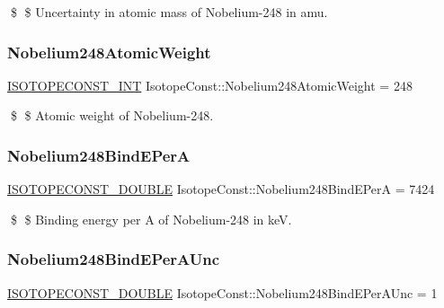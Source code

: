 \$ \$ Uncertainty in atomic mass of Nobelium-\/248 in amu. \mbox{\label{group___isotope_const-_nobelium-_no248_gaf434d32b0a303d3e1e0b02b1b6e5ca65}} 
\subsubsection{\texorpdfstring{Nobelium248\+Atomic\+Weight}{Nobelium248AtomicWeight}}
{\footnotesize\ttfamily \mbox{\hyperlink{group___isotope_const-_macros_ga5f18360b3e99483a35c32d789e62621c}{I\+S\+O\+T\+O\+P\+E\+C\+O\+N\+S\+T\+\_\+\+I\+NT}} Isotope\+Const\+::\+Nobelium248\+Atomic\+Weight = 248}

\$ \$ Atomic weight of Nobelium-\/248. \mbox{\label{group___isotope_const-_nobelium-_no248_ga08e5c7e8f6027ddc520299651cbd061a}} 
\subsubsection{\texorpdfstring{Nobelium248\+Bind\+E\+PerA}{Nobelium248BindEPerA}}
{\footnotesize\ttfamily \mbox{\hyperlink{group___isotope_const-_macros_ga8f45a7272ce02c0b4c65c44636ed719a}{I\+S\+O\+T\+O\+P\+E\+C\+O\+N\+S\+T\+\_\+\+D\+O\+U\+B\+LE}} Isotope\+Const\+::\+Nobelium248\+Bind\+E\+PerA = 7424}

\$ \$ Binding energy per A of Nobelium-\/248 in keV. \mbox{\label{group___isotope_const-_nobelium-_no248_gab64705b25614f24a1da318fc472de96b}} 
\subsubsection{\texorpdfstring{Nobelium248\+Bind\+E\+Per\+A\+Unc}{Nobelium248BindEPerAUnc}}
{\footnotesize\ttfamily \mbox{\hyperlink{group___isotope_const-_macros_ga8f45a7272ce02c0b4c65c44636ed719a}{I\+S\+O\+T\+O\+P\+E\+C\+O\+N\+S\+T\+\_\+\+D\+O\+U\+B\+LE}} Isotope\+Const\+::\+Nobelium248\+Bind\+E\+Per\+A\+Unc = 1}

